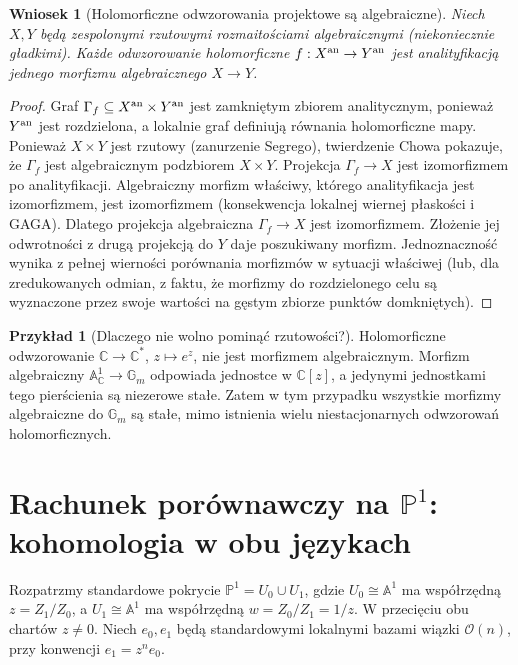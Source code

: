 \documentclass[11pt,a4paper,openany]{report}
\numberwithin{equation}{section}
\theoremstyle{plain}
\newtheorem{wniosek}[twierdzenie]{Wniosek}
\theoremstyle{definition}
\newtheorem{przyklad}[twierdzenie]{Przykład}
\theoremstyle{remark}
\newcommand{\C}{\mathbb C}
\newcommand{\A}{\mathbb A}
\newcommand{\PP}{\mathbb P}
\begin{document}
\begin{wniosek}[Holomorficzne odwzorowania projektowe są algebraiczne]
\label{wn:ga9-hol-map}
Niech $X,Y$ będą zespolonymi rzutowymi rozmaitościami
algebraicznymi (niekoniecznie gładkimi). Każde
odwzorowanie holomorficzne
$f:X^{\rm an}\to Y^{\rm an}$ jest analityfikacją
jednego morfizmu algebraicznego $X\to Y$.
\end{wniosek}
\begin{proof}
Graf $\Gamma_f\subseteq X^{\rm an}\times Y^{\rm an}$
jest zamkniętym zbiorem analitycznym, ponieważ
$Y^{\rm an}$ jest rozdzielona, a lokalnie graf
definiują równania holomorficzne mapy. Ponieważ
$X\times Y$ jest rzutowy (zanurzenie Segrego),
twierdzenie Chowa pokazuje, że $\Gamma_f$ jest
algebraicznym podzbiorem $X\times Y$. Projekcja
$\Gamma_f\to X$ jest izomorfizmem po analityfikacji.
Algebraiczny morfizm właściwy, którego analityfikacja
jest izomorfizmem, jest izomorfizmem (konsekwencja
lokalnej wiernej płaskości i GAGA). Dlatego
projekcja algebraiczna $\Gamma_f\to X$ jest
izomorfizmem. Złożenie jej odwrotności z drugą
projekcją do $Y$ daje poszukiwany morfizm.
Jednoznaczność wynika z pełnej wierności porównania morfizmów
w sytuacji właściwej (lub, dla zredukowanych odmian, z faktu,
że morfizmy do rozdzielonego celu są wyznaczone przez swoje
wartości na gęstym zbiorze punktów domkniętych).
\end{proof}

\begin{przyklad}[Dlaczego nie wolno pominąć rzutowości?]
Holomorficzne odwzorowanie $\C\to\C^*$, $z\mapsto e^z$,
nie jest morfizmem algebraicznym. Morfizm algebraiczny
$\A^1_\C\to\mathbb G_m$ odpowiada jednostce w $\C[z]$,
a jedynymi jednostkami tego pierścienia są niezerowe
stałe. Zatem w tym przypadku wszystkie morfizmy
algebraiczne do $\mathbb G_m$ są stałe, mimo istnienia wielu
niestacjonarnych odwzorowań holomorficznych.
\end{przyklad}

\section[Rachunek porównawczy na P1: kohomologia w obu językach]{Rachunek porównawczy na $\PP^1$: kohomologia w obu językach}
\label{sec:ga9-p1-cech}

Rozpatrzmy standardowe pokrycie $\PP^1=U_0\cup U_1$,
gdzie $U_0\cong\A^1$ ma współrzędną $z=Z_1/Z_0$,
a $U_1\cong\A^1$ ma współrzędną $w=Z_0/Z_1=1/z$.
W przecięciu obu chartów $z\ne0$.
Niech $e_0,e_1$ będą standardowymi lokalnymi bazami
wiązki $\mathcal O(n)$, przy konwencji $e_1=z^n e_0$.
\end{document}
